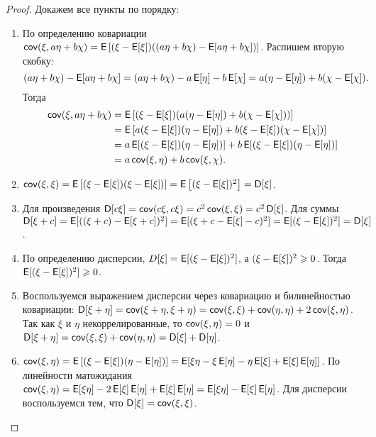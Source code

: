 \begin{proof}
    Докажем все пункты по порядку:
    \begin{enumerate}
        \item По определению ковариации \(\cov(\xi, a\eta + b\chi) = \E\left[(\xi - \E[\xi])((a\eta + b\chi)-\E[a\eta + b\chi])\right]\). Распишем вторую скобку: \[(a\eta + b\chi)-\E[a\eta + b\chi] = (a\eta + b\chi) - a\E[\eta] - b\E[\chi] = a(\eta - \E[\eta]) + b(\chi - \E[\chi]).\] Тогда
        \[\begin{aligned}
        \cov(\xi, a\eta + b\chi) &= \E\left[(\xi - \E[\xi])(a(\eta - \E[\eta]) + b(\chi - \E[\chi]))\right] \\
        &= \E\left[a(\xi - \E[\xi])(\eta - \E[\eta]) + b(\xi - \E[\xi])(\chi - \E[\chi])\right] \\
        &= a\E[(\xi - \E[\xi])(\eta - \E[\eta])] + b\E[(\xi - \E[\xi])(\eta - \E[\eta])] \\
        &= a\cov(\xi, \eta) + b\cov(\xi, \chi).
        \end{aligned}\]
        
        \item \(\cov(\xi, \xi) = \E\left[(\xi - \E[\xi])(\xi - \E[\xi])\right] = \E\left[(\xi - \E[\xi])^2\right] = \D[\xi]\).
        
        \item Для произведения \(\D[c\xi] = \cov(c\xi, c\xi) = c^2\cov(\xi, \xi) = c^2\D[\xi]\). Для суммы \(\D[\xi + c] = \E[((\xi + c) - \E[\xi + c])^2] = \E[(\xi + c - \E[\xi] - c)^2] = \E[(\xi - \E[\xi])^2] = \D[\xi]\).
        
        \item По определению дисперсии, \(D[\xi] = \E[(\xi-\E[\xi])^2]\), а \((\xi-\E[\xi])^2 \geq 0\). Тогда \(\E[(\xi-\E[\xi])^2] \geq 0\).
        
        \item Воспользуемся выражением дисперсии через ковариацию и билинейностью ковариации:
        \(\D[\xi + \eta] = \cov(\xi + \eta, \xi + \eta) = \cov(\xi, \xi) + \cov(\eta, \eta) + 2\cov(\xi, \eta)\). Так как \(\xi\) и \(\eta\) некоррелированные, то \(\cov(\xi, \eta) = 0\) и \(\D[\xi + \eta] = \cov(\xi, \xi) + \cov(\eta, \eta) = \D[\xi] + \D[\eta]\).
        
        \item \(\cov(\xi, \eta) = \E\left[(\xi - \E[\xi])(\eta-\E[\eta])\right] = \E[\xi\eta - \xi\E[\eta] - \eta\E[\xi] + \E[\xi]\E[\eta]]\). По линейности матожидания \(\cov(\xi, \eta) = \E[\xi\eta] - 2\E[\xi]\E[\eta] + \E[\xi]\E[\eta] = \E[\xi\eta] - \E[\xi]\E[\eta]\). Для дисперсии воспользуемся тем, что \(\D[\xi] = \cov(\xi, \xi)\).
    \end{enumerate}
\end{proof}
